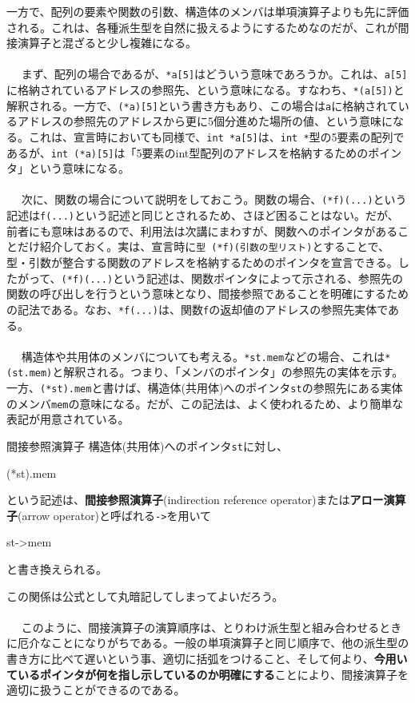 一方で、配列の要素や関数の引数、構造体のメンバは単項演算子よりも先に評価される。これは、各種派生型を自然に扱えるようにするためなのだが、これが間接演算子と混ざると少し複雑になる。
\\ \\　
まず、配列の場合であるが、\verb|*a[5]|はどういう意味であろうか。これは、\verb|a[5]|に格納されているアドレスの参照先、という意味になる。すなわち、\verb|*(a[5])|と解釈される。一方で、\verb|(*a)[5]|という書き方もあり、この場合は\verb|a|に格納されているアドレスの参照先のアドレスから更に5個分進めた場所の値、という意味になる。これは、宣言時においても同様で、\verb|int *a[5]|は、\verb|int *|型の5要素の配列であるが、\verb|int (*a)[5]|は「5要素のint型配列のアドレスを格納するためのポインタ」という意味になる。
\\ \\　
次に、関数の場合について説明をしておこう。関数の場合、\verb|(*f)(...)|という記述は\verb|f(...)|という記述と同じとされるため、さほど困ることはない。だが、前者にも意味はあるので、利用法は次講にまわすが、関数へのポインタがあることだけ紹介しておく。実は、宣言時に\verb|型 (*f)(引数の型リスト)|とすることで、型・引数が整合する関数のアドレスを格納するためのポインタを宣言できる。したがって、\verb|(*f)(...)|という記述は、関数ポインタによって示される、参照先の関数の呼び出しを行うという意味となり、間接参照であることを明確にするための記法である。なお、\verb|*f(...)|は、関数\verb|f|の返却値のアドレスの参照先実体である。
\\ \\　
構造体や共用体のメンバについても考える。\verb|*st.mem|などの場合、これは\verb|*(st.mem)|と解釈される。つまり、「メンバのポインタ」の参照先の実体を示す。一方、\verb|(*st).mem|と書けば、構造体(共用体)へのポインタ\verb|st|の参照先にある実体のメンバ\verb|mem|の意味になる。だが、この記法は、よく使われるため、より簡単な表記が用意されている。
\begin{itembox}[l]{間接参照演算子}
構造体(共用体)へのポインタ\verb|st|に対し、
\begin{code}
(*st).mem
\end{code}
という記述は、\textbf{間接参照演算子}(indirection reference operator)または\textbf{アロー演算子}(arrow operator)と呼ばれる\verb|->|を用いて
\begin{code}
st->mem
\end{code}
と書き換えられる。
\end{itembox}
この関係は公式として丸暗記してしまってよいだろう。
\\ \\　
このように、間接演算子の演算順序は、とりわけ派生型と組み合わせるときに厄介なことになりがちである。一般の単項演算子と同じ順序で、他の派生型の書き方に比べて遅いという事、適切に括弧をつけること、そして何より、\textbf{今用いているポインタが何を指し示しているのか明確にする}ことにより、間接演算子を適切に扱うことができるのである。

